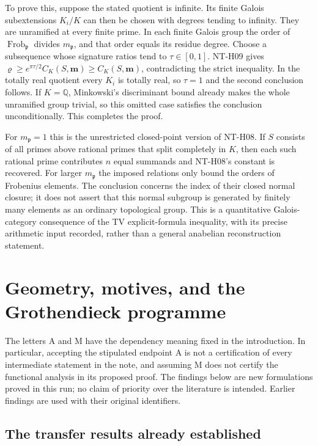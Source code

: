 \documentclass[11pt,a4paper]{article}
\begin{document}
To prove this, suppose the stated quotient is infinite.  Its finite
Galois subextensions $K_i/K$ can then be chosen with degrees tending
to infinity.  They are unramified at every finite prime.  In each
finite Galois group the order of
$\operatorname{Frob}_{\mathfrak p}$ divides
$m_{\mathfrak p}$, and that order equals its residue degree.
Choose a subsequence whose signature ratios tend to
$\tau\in[0,1]$.  NT-H09 gives
$\varrho\ge e^{\pi\tau/2}C_K(S,\boldsymbol m)
\ge C_K(S,\boldsymbol m)$, contradicting the strict inequality.
In the totally real quotient every $K_i$ is totally real, so
$\tau=1$ and the second conclusion follows.  If $K=\mathbb Q$,
Minkowski's discriminant bound already makes the whole unramified
group trivial, so this omitted case satisfies the conclusion
unconditionally.  This completes the proof.

For $m_{\mathfrak p}=1$ this is the unrestricted closed-point
version of NT-H08.  If $S$ consists of all primes above rational
primes that split completely in $K$, then each such rational prime
contributes $n$ equal summands and NT-H08's constant is recovered.
For larger $m_{\mathfrak p}$ the imposed relations only bound the
orders of Frobenius elements.  The conclusion concerns the index
of their closed normal closure; it does not assert that this normal
subgroup is generated by finitely many elements as an ordinary
topological group.  This is a quantitative Galois-category
consequence of the TV explicit-formula inequality, with its precise
arithmetic input recorded, rather than a general anabelian
reconstruction statement.


\section{Geometry, motives, and the Grothendieck programme}
\label{sec:geometry}

The letters A and M have the dependency meaning fixed in the introduction.
In particular, accepting the stipulated endpoint A is not a certification of
every intermediate statement in the note, and assuming M does not certify
the functional analysis in its proposed proof. The findings below are new
formulations proved in this run; no claim of priority over the literature is
intended. Earlier findings are used with their original identifiers.

\subsection{The transfer results already established}
\label{ag:transfer}
\end{document}
